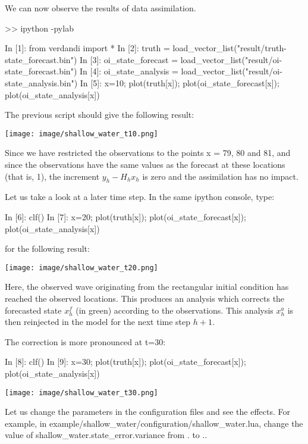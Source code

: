 \documentclass{tufte-book}
\newcounter{points}
\begin{document}
\-We can now observe the results of data assimilation.
\begin{frame_python}
>> ipython -pylab

In  [1]: from verdandi import *
In  [2]: truth = load_vector_list("result/truth-state_forecast.bin")
In  [3]: oi_state_forecast = load_vector_list("result/oi-state_forecast.bin")
In  [4]: oi_state_analysis = load_vector_list("result/oi-state_analysis.bin")
In  [5]: x=10; plot(truth[x]); plot(oi_state_forecast[x]); plot(oi_state_analysis[x])
\end{frame_python}


\-The previous script should give the following result\-:

\texttt{[image: image/shallow\_water\_t10.png]}


\-Since we have restricted the observations to the points x = 79, 80 and 81, and since the observations have the same values as the forecast at these locations (that is, 1), the increment $y_h - H_h x_h$ is zero and the assimilation has no impact.

\-Let us take a look at a later time step. \-In the same ipython console, type\-:

 \begin{frame_python}
In  [6]: clf()
In  [7]: x=20; plot(truth[x]); plot(oi_state_forecast[x]); plot(oi_state_analysis[x])
\end{frame_python}


for the following result\-:

\texttt{[image: image/shallow\_water\_t20.png]}

 \-Here, the observed wave originating from the rectangular initial condition has reached the observed locations. \-This produces an analysis which corrects the forecasted state $x_h^f$ (in green) according to the observations. \-This analysis $x^a_h$ is then reinjected in the model for the next time step $h+1$.

The correction is \-more pronounced at t=30\-:

 \begin{frame_python}
In  [8]: clf()
In  [9]: x=30; plot(truth[x]); plot(oi_state_forecast[x]); plot(oi_state_analysis[x])
\end{frame_python}


\texttt{[image: image/shallow\_water\_t30.png]}




\-Let us change the parameters in the configuration files and see the effects. \-For example, in {\ttfamily example/shallow\-\_\-water/configuration/shallow\-\_\-water.\-lua}, change the value of {\ttfamily shallow\-\_\-water.\-state\-\_\-error.\-variance} from {.} to {.}.
\end{document}
